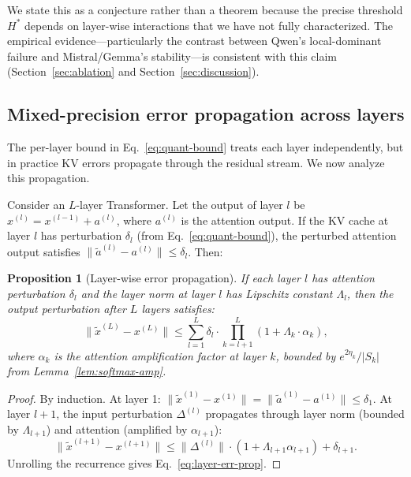 \documentclass[11pt]{article}
\theoremstyle{plain}
\newtheorem{proposition}{Proposition}
\theoremstyle{definition}
\begin{document}
We state this as a conjecture rather than a theorem because the precise threshold $H^*$ depends on layer-wise interactions that we have not fully characterized.  The empirical evidence---particularly the contrast between Qwen's local-dominant failure and Mistral/Gemma's stability---is consistent with this claim (Section~\ref{sec:ablation} and Section~\ref{sec:discussion}).

\subsection{Mixed-precision error propagation across layers}
\label{sec:layer-error}

The per-layer bound in Eq.~\eqref{eq:quant-bound} treats each layer independently, but in practice KV errors propagate through the residual stream.  We now analyze this propagation.

Consider an $L$-layer Transformer.  Let the output of layer $l$ be $x^{(l)} = x^{(l-1)} + a^{(l)}$, where $a^{(l)}$ is the attention output.  If the KV cache at layer $l$ has perturbation $\delta_l$ (from Eq.~\eqref{eq:quant-bound}), the perturbed attention output satisfies $\|\tilde a^{(l)} - a^{(l)}\| \le \delta_l$.  Then:

\begin{proposition}[Layer-wise error propagation]
\label{prop:layer-err}
If each layer $l$ has attention perturbation $\delta_l$ and the layer norm at layer $l$ has Lipschitz constant $\Lambda_l$, then the output perturbation after $L$ layers satisfies:
\begin{equation}
  \|\tilde x^{(L)} - x^{(L)}\| \le \sum_{l=1}^{L} \delta_l \cdot \prod_{k=l+1}^{L} (1 + \Lambda_k \cdot \alpha_k),
  \label{eq:layer-err-prop}
\end{equation}
where $\alpha_k$ is the attention amplification factor at layer $k$, bounded by $e^{2\eta_k}/|S_k|$ from Lemma~\ref{lem:softmax-amp}.
\end{proposition}
\begin{proof}
By induction.  At layer 1: $\|\tilde x^{(1)} - x^{(1)}\| = \|\tilde a^{(1)} - a^{(1)}\| \le \delta_1$.  At layer $l+1$, the input perturbation $\Delta^{(l)}$ propagates through layer norm (bounded by $\Lambda_{l+1}$) and attention (amplified by $\alpha_{l+1}$):
\[
  \|\tilde x^{(l+1)} - x^{(l+1)}\| \le \|\Delta^{(l)}\| \cdot (1 + \Lambda_{l+1} \alpha_{l+1}) + \delta_{l+1}.
\]
Unrolling the recurrence gives Eq.~\eqref{eq:layer-err-prop}.
\end{proof}
\end{document}
